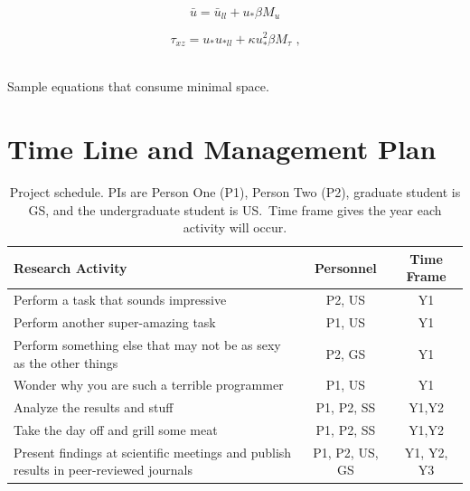 \begin{center}
\begin{minipage}{.3\textwidth}
\begin{equation}
 \bar u = \bar u_{ll} + u_* \beta M_{u} \label{new_u}
\end{equation}
\end{minipage}
\begin{minipage}{.36\linewidth}
\begin{equation}
  \tau_{xz} = u_* u_{*ll} + \kappa u_*^2 \beta M_{\tau} \label{new_tau} \mbox{ ,}
\end{equation}
\end{minipage}
~\\Sample equations that consume minimal space.
\end{center}



\section{Time Line and Management Plan}

\begin{table}[H]
\label{table1}
\renewcommand{\arraystretch}{0}
\caption{Project schedule.  PIs are Person One (P1), Person Two (P2), graduate student is GS, and the undergraduate student is US.\ Time frame gives the year each activity will occur.}
\scriptsize
\begin{tabularx}{\textwidth}{Y c c }
\hline
\hline
\textbf{Research Activity} & \textbf{Personnel} & \textbf{Time Frame}\\
\hline
Perform a task that sounds impressive & P2, US & Y1 \T\\
Perform another super-amazing task & P1, US & Y1 \T\\
Perform something else that may not be as sexy as the other things & P2, GS & Y1 \T\\
Wonder why you are such a terrible programmer & P1, US & Y1 \T\\
Analyze the results and stuff & P1, P2, SS & Y1,Y2 \T\\
Take the day off and grill some meat & P1, P2, SS & Y1,Y2 \T\\
Present findings at scientific meetings and publish results in peer-reviewed journals & P1, P2, US, GS & Y1, Y2, Y3\T\B\\
\hline
\hline
\end{tabularx}
\end{table}

